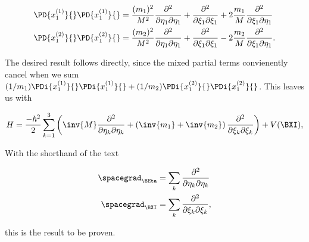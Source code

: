 \begin{align}\label{eqn:bohm15:pr2:3}
\PD{x_1^{(1)}}{} \PD{x_1^{(1)}}{}
&=
\frac{(m_1)^2}{M^2} \frac{\partial^2}{\partial \eta_1 \partial \eta_1}{}
+\frac{\partial^2}{\partial \xi_1 \partial \xi_1}{}
+2 \frac{m_1}{M} \frac{\partial^2}{\partial \xi_1 \partial \eta_1}{} \\
\PD{x_1^{(2)}}{} \PD{x_1^{(2)}}{}
&=
\frac{(m_2)^2}{M^2} \frac{\partial^2}{\partial \eta_1 \partial \eta_1}{}
+\frac{\partial^2}{\partial \xi_1 \partial \xi_1}{}
-2 \frac{m_2}{M} \frac{\partial^2}{\partial \xi_1 \partial \eta_1}{}.
\end{align}

The desired result follows directly, since the mixed partial terms convienently cancel when we sum $(1/m_1) \PDi{x_1^{(1)}}{} \PDi{x_1^{(1)}}{} +(1/m_2) \PDi{x_1^{(2)}}{} \PDi{x_1^{(2)}}{}$.  This leaves us with

\begin{align}\label{eqn:bohm15:pr2:4}
H = 
\frac{-\hbar^2}{2} \sum_{k=1}^3 \left( 
\inv{M} \frac{\partial^2}{\partial \eta_k \partial \eta_k}{}
+ \left( \inv{m_1} + \inv{m_2} \right) \frac{\partial^2}{\partial \xi_k \partial \xi_k}{}
\right)
+ V(\BXI),
\end{align}

With the shorthand of the text

\begin{align}\label{eqn:bohm15:pr2:5}
\spacegrad_{\BEta} &= \sum_k \frac{\partial^2}{\partial \eta_k \partial \eta_k}{} \\
\spacegrad_{\BXI} &= \sum_k \frac{\partial^2}{\partial \xi_k \partial \xi_k}{},
\end{align}

this is the result to be proven.

\EndArticle
